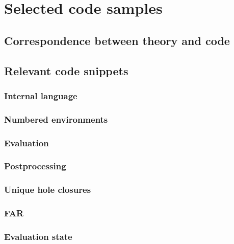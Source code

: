 \chapter{Selected code samples}
\label{app:code-samples}

\section{Correspondence between theory and code}
\label{sec:correspondence}


\section{Relevant code snippets}
\label{sec:relevant-code}


\subsection{Internal language}
\label{sec:code-internal-language}


\subsection{Numbered environments}
\label{sec:code-evalenv}


\subsection{Evaluation}
\label{sec:code-evaluator}


\subsection{Postprocessing}
\label{sec:code-postprocessing}


\subsection{Unique hole closures}
\label{sec:code-hole-closures}


\subsection{FAR}
\label{sec:code-far}


\subsection{Evaluation state}
\label{sec:code-evalstate}


